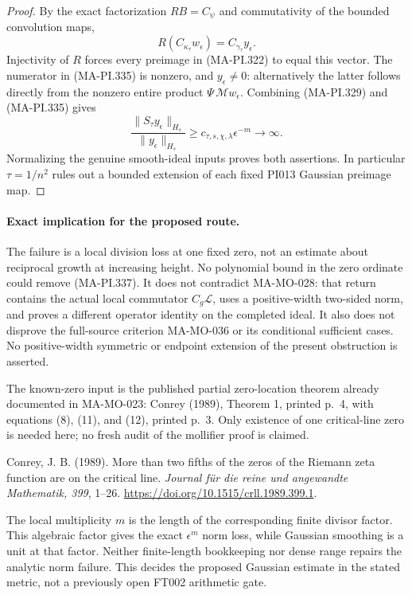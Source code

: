 \begin{proof}
By the exact factorization \(RB=C_\psi\) and
commutativity of the bounded convolution maps,
\[
 R(C_{\kappa_\tau}w_\epsilon)
       =C_{\gamma_\tau}y_\epsilon .
 \tag{MA-PI.336}
\]
Injectivity of \(R\) forces every preimage in
(MA-PI.322) to equal this vector.  The numerator
in (MA-PI.335) is nonzero, and \(y_\epsilon\ne0\):
alternatively the latter follows directly from
the nonzero entire product
\(\Psi\,\mathcal Mw_\epsilon\).
Combining (MA-PI.329) and (MA-PI.335) gives
\[
 \frac{\|S_\tau y_\epsilon\|_{H_s}}
      {\|y_\epsilon\|_{H_s}}
       \ge c_{\tau,s,\chi,\lambda}\epsilon^{-m}
                         \longrightarrow\infty .
 \tag{MA-PI.337}
\]
Normalizing the genuine smooth-ideal inputs proves
both assertions.  In particular
\(\tau=1/n^2\) rules out a bounded extension
of each fixed PI013 Gaussian preimage map.
\end{proof}

\paragraph{Exact implication for the proposed route.}
The failure is a local division loss at one fixed
zero, not an estimate about reciprocal growth at
increasing height.  No polynomial bound in the
zero ordinate could remove (MA-PI.337).
It does not contradict MA-MO-028: that return
contains the actual local commutator
\(C_g\mathcal L\), uses a positive-width
two-sided norm, and proves a different operator
identity on the completed ideal.  It also does
not disprove the full-source criterion MA-MO-036
or its conditional sufficient cases.
No positive-width symmetric or endpoint extension
of the present obstruction is asserted.

The known-zero input is the published partial
zero-location theorem already documented in
MA-MO-023: Conrey (1989), Theorem 1, printed
p.~4, with equations (8), (11), and (12),
printed p.~3.  Only existence of one
critical-line zero is needed here; no fresh
audit of the mollifier proof is claimed.

Conrey, J. B. (1989). More than two fifths of
the zeros of the Riemann zeta function are on
the critical line. \emph{Journal f\"ur die
reine und angewandte Mathematik, 399}, 1--26.
\url{https://doi.org/10.1515/crll.1989.399.1}.

The local multiplicity \(m\) is the length of
the corresponding finite divisor factor.
This algebraic factor gives the exact
\(\epsilon^m\) norm loss, while Gaussian
smoothing is a unit at that factor.  Neither
finite-length bookkeeping nor dense range
repairs the analytic norm failure.  This
decides the proposed Gaussian estimate in
the stated metric, not a previously open
FT002 arithmetic gate.
